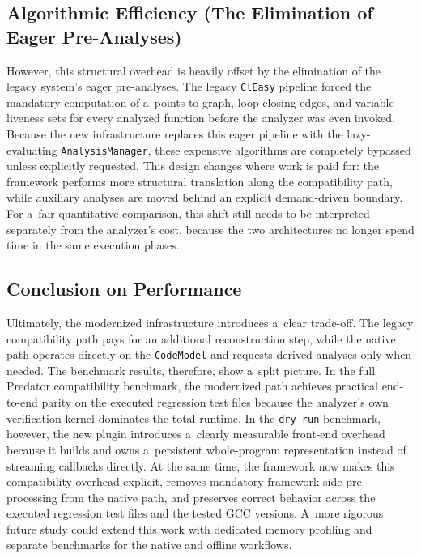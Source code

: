 \documentclass[xpsejal00-gcc-plugin.tex]{subfiles}
\begin{document}
\subsection*{Algorithmic Efficiency (The Elimination of Eager Pre-Analyses)}\label{sec:algorithmic-efficiency}

However, this structural overhead is heavily offset by the elimination of the legacy system's eager pre-analyses.
The legacy \texttt{ClEasy} pipeline forced the mandatory computation of a~points-to graph, loop-closing edges, and variable liveness sets for every analyzed function before the analyzer was even invoked.
Because the new infrastructure replaces this eager pipeline with the lazy-evaluating \texttt{AnalysisManager}, these expensive algorithms are completely bypassed unless explicitly requested.
This design changes where work is paid for: the framework performs more structural translation along the compatibility path, while auxiliary analyses are moved behind an explicit demand-driven boundary.
For a~fair quantitative comparison, this shift still needs to be interpreted separately from the analyzer's cost, because the two architectures no longer spend time in the same execution phases.

\subsection*{Conclusion on Performance}\label{sec:performance-conclusion}

Ultimately, the modernized infrastructure introduces a~clear trade-off.
The legacy compatibility path pays for an additional reconstruction step, while the native path operates directly on the \texttt{CodeModel} and requests derived analyses only when needed.
The benchmark results, therefore, show a~split picture.
In the full Predator compatibility benchmark, the modernized path achieves practical end-to-end parity on the executed regression test files because the analyzer's own verification kernel dominates the total runtime.
In the \texttt{dry-run} benchmark, however, the new plugin introduces a~clearly measurable front-end overhead because it builds and owns a~persistent whole-program representation instead of streaming callbacks directly.
At the same time, the framework now makes this compatibility overhead explicit, removes mandatory framework-side pre-processing from the native path, and preserves correct behavior across the executed regression test files and the tested GCC versions.
A~more rigorous future study could extend this work with dedicated memory profiling and separate benchmarks for the native and offline workflows.
\end{document}
